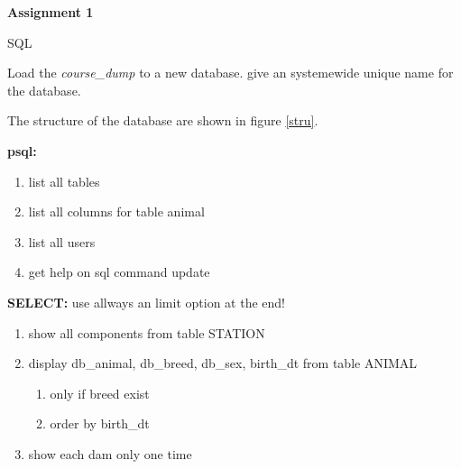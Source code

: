 \documentclass[10pt,a4paper,DIV14]{scrartcl}
\begin{document}
\centerline{\Large \bf Assignment 1}
\vspace{5mm}
\centerline{\Large  SQL}
\vspace{12mm}

Load the {\it course\_dump} to a new database. give an
systemewide unique name for the database.
\vspace{5mm}

The structure of the database are shown in figure \ref{stru}.
\vspace{5mm}

{\bf psql:}
\begin{enumerate}
\item list all tables
\item list all columns for table animal
\item list all users
\item get help on sql command update
\end{enumerate}


{\bf SELECT:} use allways an limit option at the end!
\begin{enumerate}
\item show all components from table STATION
\item display db\_animal, db\_breed, db\_sex, birth\_dt from table
  ANIMAL
  \begin{enumerate}
  \item only if breed exist
  \item order by birth\_dt
  \end{enumerate}
\item show each dam only one time
\end{enumerate}
\end{document}
